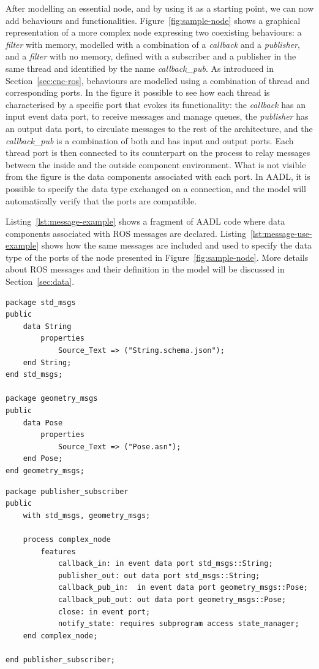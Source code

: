 After modelling an essential node, and by using it as a starting point, we can now add behaviours and functionalities. Figure~\ref{fig:sample-node} shows a graphical representation of a more complex node expressing two coexisting behaviours: a \textit{filter} with memory, modelled with a combination of a \textit{callback} and a \textit{publisher}, and a \textit{filter} with no memory, defined with a subscriber and a publisher in the same thread and identified by the name \textit{callback\_pub}. As introduced in Section~\ref{sec:cnc-ros}, behaviours are modelled using a combination of thread and corresponding ports. In the figure it possible to see how each thread is characterised by a specific port that evokes its functionality: the \textit{callback} has an input event data port, to receive messages and manage queues, the \textit{publisher} has an output data port, to circulate messages to the rest of the architecture, and the \textit{callback\_pub} is a combination of both and has input and output ports. Each thread port is then connected to its counterpart on the process to relay messages between the inside and the outside component environment. What is not visible from the figure is the data components associated with each port. In AADL, it is possible to specify the data type exchanged on a connection, and the model will automatically verify that the ports are compatible. 

Listing~\ref{lst:message-example} shows a fragment of AADL code where data components associated with ROS messages are declared. Listing~\ref{lst:message-use-example} shows how the same messages are included and used to specify the data type of the ports of the node presented in Figure~\ref{fig:sample-node}. More details about ROS messages and their definition in the model will be discussed in Section~\ref{sec:data}.

\begin{lstlisting}[language=AADL,caption={Definition of ROS messages using AADL data components.},label=lst:message-example]
package std_msgs
public
	data String
		properties
			Source_Text => ("String.schema.json");
	end String;
end std_msgs;

package geometry_msgs
public
	data Pose
		properties
			Source_Text => ("Pose.asn");
	end Pose;
end geometry_msgs;
\end{lstlisting}

\begin{lstlisting}[language=AADL,caption={Use of AADL data component to specify the data type of a port.},label=lst:message-use-example]
package publisher_subscriber
public
	with std_msgs, geometry_msgs;

	process complex_node
		features
			callback_in: in event data port std_msgs::String;
			publisher_out: out data port std_msgs::String;
			callback_pub_in:  in event data port geometry_msgs::Pose;
			callback_pub_out: out data port geometry_msgs::Pose;
			close: in event port;
			notify_state: requires subprogram access state_manager;
	end complex_node;

end publisher_subscriber;
\end{lstlisting}

